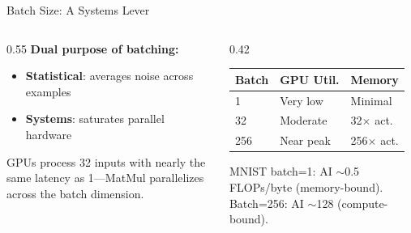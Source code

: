 \documentclass[aspectratio=169, 12pt]{beamer}
\begin{document}
\begin{frame}{Batch Size: A Systems Lever}

\small
\begin{columns}[T]
  \begin{column}{0.55\textwidth}
    \textbf{Dual purpose of batching:}
    \begin{itemize}\setlength\itemsep{0pt}
      \item \textbf{Statistical}: averages noise across examples
      \item \textbf{Systems}: saturates parallel hardware
    \end{itemize}

    \vspace{0.1cm}
    {\footnotesize GPUs process 32 inputs with nearly the same latency as 1---MatMul parallelizes across the batch dimension.}

    \vspace{0.1cm}
  \end{column}
  \begin{column}{0.42\textwidth}
    {\footnotesize
    \renewcommand{\arraystretch}{1.1}
    \begin{tabular}{@{}lll@{}}
      \toprule
      \textbf{Batch} & \textbf{GPU Util.} & \textbf{Memory} \\
      \midrule
      1   & Very low    & Minimal \\
      32  & Moderate    & 32$\times$ act. \\
      256 & Near peak   & 256$\times$ act. \\
      \bottomrule
    \end{tabular}
    }

    \vspace{0.1cm}
    {\footnotesize MNIST batch=1: AI $\sim$0.5 FLOPs/byte (memory-bound). Batch=256: AI $\sim$128 (compute-bound).}
  \end{column}
\end{columns}

\end{frame}
\end{document}
